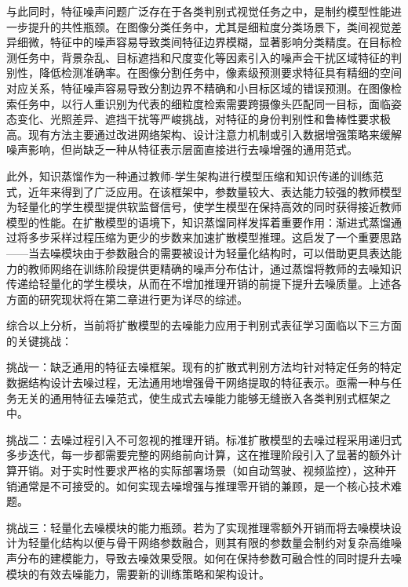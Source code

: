 与此同时，特征噪声问题广泛存在于各类判别式视觉任务之中，是制约模型性能进一步提升的共性瓶颈。在图像分类任务中\cite{deng2009imagenet,krizhevsky2012imagenet}，尤其是细粒度分类场景\cite{wah2011caltech,parkhi2012cats,nilsback2008automated}下，类间视觉差异细微，特征中的噪声容易导致类间特征边界模糊，显著影响分类精度。在目标检测任务中\cite{ren2015faster,he2017mask,carion2020end}，背景杂乱、目标遮挡和尺度变化等因素引入的噪声会干扰区域特征的判别性，降低检测准确率。在图像分割任务中\cite{long2015fully,xie2021segformer,zhou2017scene}，像素级预测要求特征具有精细的空间对应关系，特征噪声容易导致分割边界不精确和小目标区域的错误预测。在图像检索任务中\cite{ye2021deep,bedagkar2014survey,lin2015deep}，以行人重识别为代表的细粒度检索需要跨摄像头匹配同一目标，面临姿态变化、光照差异、遮挡干扰等严峻挑战\cite{liao2015person,wang2020high,ni2023part}，对特征的身份判别性和鲁棒性要求极高。现有方法主要通过改进网络架构\cite{he2016deep,dosovitskiy2020image,liu2021swin}、设计注意力机制\cite{vaswani2017attention}或引入数据增强策略来缓解噪声影响，但尚缺乏一种从特征表示层面直接进行去噪增强的通用范式。

此外，知识蒸馏\cite{hinton2015distilling}作为一种通过教师-学生架构进行模型压缩和知识传递的训练范式，近年来得到了广泛应用。在该框架中，参数量较大、表达能力较强的教师模型为轻量化的学生模型提供软监督信号，使学生模型在保持高效的同时获得接近教师模型的性能。在扩散模型的语境下，知识蒸馏同样发挥着重要作用：渐进式蒸馏\cite{salimans2022progressive}通过将多步采样过程压缩为更少的步数来加速扩散模型推理。这启发了一个重要思路——当去噪模块由于参数融合的需要被设计为轻量化结构时，可以借助更具表达能力的教师网络在训练阶段提供更精确的噪声分布估计，通过蒸馏将教师的去噪知识传递给轻量化的学生模块，从而在不增加推理开销的前提下提升去噪质量。上述各方面的研究现状将在第二章进行更为详尽的综述。

综合以上分析，当前将扩散模型的去噪能力应用于判别式表征学习面临以下三方面的关键挑战：

挑战一：缺乏通用的特征去噪框架。现有的扩散式判别方法均针对特定任务的特定数据结构设计去噪过程，无法通用地增强骨干网络提取的特征表示。亟需一种与任务无关的通用特征去噪范式，使生成式去噪能力能够无缝嵌入各类判别式框架之中。

挑战二：去噪过程引入不可忽视的推理开销。标准扩散模型的去噪过程采用递归式多步迭代，每一步都需要完整的网络前向计算，这在推理阶段引入了显著的额外计算开销。对于实时性要求严格的实际部署场景（如自动驾驶、视频监控），这种开销通常是不可接受的。如何实现去噪增强与推理零开销的兼顾，是一个核心技术难题。

挑战三：轻量化去噪模块的能力瓶颈。若为了实现推理零额外开销而将去噪模块设计为轻量化结构以便与骨干网络参数融合，则其有限的参数量会制约对复杂高维噪声分布的建模能力，导致去噪效果受限。如何在保持参数可融合性的同时提升去噪模块的有效去噪能力，需要新的训练策略和架构设计。

